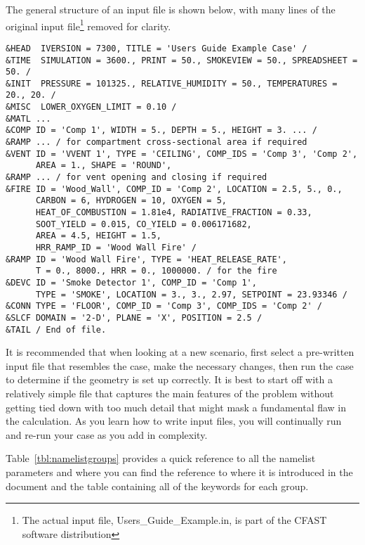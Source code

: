 The general structure of an input file is shown below, with many lines of the original input file\footnote{The actual input file, Users\_Guide\_Example.in, is part of the CFAST software distribution} removed for clarity.

\begin{lstlisting}
&HEAD  IVERSION = 7300, TITLE = 'Users Guide Example Case' /
&TIME  SIMULATION = 3600., PRINT = 50., SMOKEVIEW = 50., SPREADSHEET = 50. /
&INIT  PRESSURE = 101325., RELATIVE_HUMIDITY = 50., TEMPERATURES = 20., 20. /
&MISC  LOWER_OXYGEN_LIMIT = 0.10 /
&MATL ...
&COMP ID = 'Comp 1', WIDTH = 5., DEPTH = 5., HEIGHT = 3. ... /
&RAMP ... / for compartment cross-sectional area if required
&VENT ID = 'VVENT 1', TYPE = 'CEILING', COMP_IDS = 'Comp 3', 'Comp 2', 
      AREA = 1., SHAPE = 'ROUND',
&RAMP ... / for vent opening and closing if required
&FIRE ID = 'Wood_Wall', COMP_ID = 'Comp 2', LOCATION = 2.5, 5., 0.,
      CARBON = 6, HYDROGEN = 10, OXYGEN = 5, 
      HEAT_OF_COMBUSTION = 1.81e4, RADIATIVE_FRACTION = 0.33,
      SOOT_YIELD = 0.015, CO_YIELD = 0.006171682,
      AREA = 4.5, HEIGHT = 1.5,
      HRR_RAMP_ID = 'Wood Wall Fire' /
&RAMP ID = 'Wood Wall Fire', TYPE = 'HEAT_RELEASE_RATE', 
      T = 0., 8000., HRR = 0., 1000000. / for the fire
&DEVC ID = 'Smoke Detector 1', COMP_ID = 'Comp 1', 
      TYPE = 'SMOKE', LOCATION = 3., 3., 2.97, SETPOINT = 23.93346 /
&CONN TYPE = 'FLOOR', COMP_ID = 'Comp 3', COMP_IDS = 'Comp 2' /
&SLCF DOMAIN = '2-D', PLANE = 'X', POSITION = 2.5 /
&TAIL / End of file.
\end{lstlisting}
It is recommended that when looking at a new scenario, first select a pre-written input file that resembles the case, make the necessary changes, then run the case to determine if the geometry is set up correctly. It is best to start off with a relatively simple file that captures the main features of the problem without getting tied down with too much detail that might mask a fundamental flaw in the calculation. As you learn how to write input files, you will continually run and re-run your case as you add in complexity.

Table~\ref{tbl:namelistgroups} provides a quick reference to all the namelist parameters and where you can find the reference to where it is introduced in the document and the table containing all of the keywords for each group.


